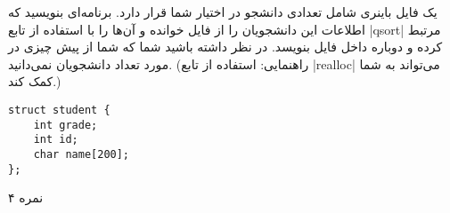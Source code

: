 \documentclass[../main.tex]{subfiles}
\begin{document}
یک فایل باینری شامل تعدادی دانشجو در اختیار شما قرار دارد. برنامه‌ای بنویسید که اطلاعات این دانشجویان را از فایل خوانده و آن‌ها را با استفاده از تابع |qsort| مرتبط کرده و دوباره داخل فایل بنویسد.
در نظر داشته باشید شما که شما از پیش چیزی در مورد تعداد دانشجویان نمی‌دانید. (راهنمایی: استفاده از تابع |realloc| می‌تواند به شما کمک کند.)

\begin{latin}
\begin{verbatim}
struct student {
    int grade;
    int id;
    char name[200];
};
\end{verbatim}
\end{latin}

۴ نمره
\end{document}
